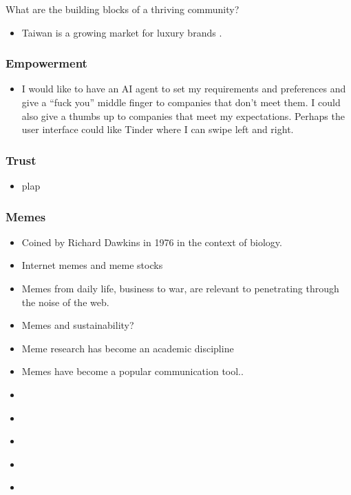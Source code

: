 \documentclass[
  letterpaper,
  DIV=11,
  numbers=noendperiod]{scrartcl}
\providecommand{\tightlist}{%
  \setlength{\itemsep}{0pt}\setlength{\parskip}{0pt}}\usepackage{longtable,booktabs,array}
\begin{document}
What are the building blocks of a thriving community?

\begin{itemize}
\tightlist
\item
  Taiwan is a growing market for luxury brands
  \citep{karatzasConsumersPerceptionsComplexity2019}.
\end{itemize}

\subsubsection{Empowerment}\label{empowerment}

\begin{itemize}
\tightlist
\item
  I would like to have an AI agent to set my requirements and
  preferences and give a ``fuck you'' middle finger to companies that
  don't meet them. I could also give a thumbs up to companies that meet
  my expectations. Perhaps the user interface could like Tinder where I
  can swipe left and right.
\end{itemize}

\subsubsection{Trust}\label{trust}

\begin{itemize}
\tightlist
\item
  plap
\end{itemize}

\subsubsection{Memes}\label{memes}

\begin{itemize}
\item
  Coined by Richard Dawkins in 1976 in the context of biology.
\item
  Internet memes and meme stocks
\item
  Memes from daily life, business to war, are relevant to penetrating
  through the noise of the web.
\item
  Memes and sustainability?
\item
  Meme research has become an academic discipline
\item
  Memes have become a popular communication tool..
\item
  \citet{zidaniMessyInternetMemes2021}
\item
  \citet{zidaniHowConductInternet2022}
\item
  \citet{irinalyanWhenGangnamHits2015}
\item
  \citet{zannettouOriginsMemesMeans2018}
\item
  \citet{peters-lazaroPopularCultureCivic2020}
\end{itemize}
\end{document}
